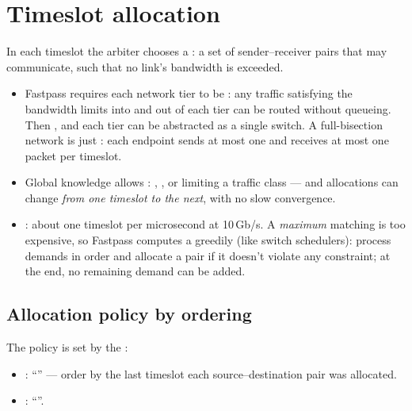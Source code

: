 \section{Timeslot allocation}
In each timeslot the arbiter chooses a : a set of sender--receiver pairs that may communicate, such that no link's bandwidth is exceeded.
\begin{itemize}
\item Fastpass requires each network tier to be : any traffic satisfying the bandwidth limits into and out of each tier can be routed without queueing. Then , and each tier can be abstracted as a single switch. A full-bisection network is just : each endpoint sends at most one and receives at most one packet per timeslot.
\item Global knowledge allows : , , or limiting a traffic class --- and allocations can change \emph{from one timeslot to the next}, with no slow convergence.
\item {}: about one timeslot per microsecond at 10\,Gb/s. A \emph{maximum} matching is too expensive, so Fastpass computes a  greedily (like switch schedulers): process demands in order and allocate a pair if it doesn't violate any constraint; at the end, no remaining demand can be added.
\end{itemize}

\subsection{Allocation policy by ordering}
The policy is set by the :
\begin{itemize}
\item {}: ``'' --- order by the last timeslot each source--destination pair was allocated.
\item {}: ``''.
\end{itemize}

